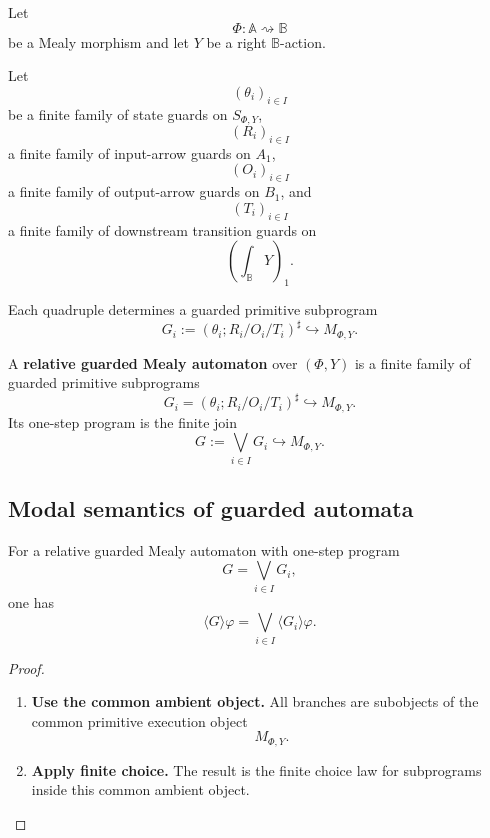 Let
\[
\Phi:\mathbb A\rightsquigarrow\mathbb B
\]
be a Mealy morphism and let \(Y\) be a right \(\mathbb B\)-action.

Let
\[
(\theta_i)_{i\in I}
\]
be a finite family of state guards on \(S_{\Phi,Y}\),
\[
(R_i)_{i\in I}
\]
a finite family of input-arrow guards on \(A_1\),
\[
(O_i)_{i\in I}
\]
a finite family of output-arrow guards on \(B_1\), and
\[
(T_i)_{i\in I}
\]
a finite family of downstream transition guards on
\[
\left(\int_{\mathbb B}Y\right)_1.
\]

Each quadruple determines a guarded primitive subprogram
\[
G_i:=(\theta_i;R_i/O_i/T_i)^\sharp\hookrightarrow M_{\Phi,Y}.
\]

\begin{definition}
\label{def:poly-relative-guarded-mealy-automaton}
A \textbf{relative guarded Mealy automaton} over \((\Phi,Y)\) is a finite
family of guarded primitive subprograms
\[
G_i=(\theta_i;R_i/O_i/T_i)^\sharp\hookrightarrow M_{\Phi,Y}.
\]
Its one-step program is the finite join
\[
G:=\bigvee_{i\in I}G_i\hookrightarrow M_{\Phi,Y}.
\]
\end{definition}

\subsection{Modal semantics of guarded automata}
\label{subsec:poly-relative-guarded-automata-modal-semantics}

\begin{proposition}
\label{prop:poly-relative-guarded-automaton-diamond}
For a relative guarded Mealy automaton with one-step program
\[
G=\bigvee_{i\in I}G_i,
\]
one has
\[
\langle G\rangle\varphi
=
\bigvee_{i\in I}\langle G_i\rangle\varphi.
\]
\end{proposition}

\begin{proof}
\leavevmode
\begin{enumerate}
\item \textbf{Use the common ambient object.}
All branches are subobjects of the common primitive execution object
\[
M_{\Phi,Y}.
\]

\item \textbf{Apply finite choice.}
The result is the finite choice law for subprograms inside this common ambient
object.
\end{enumerate}
\end{proof}

